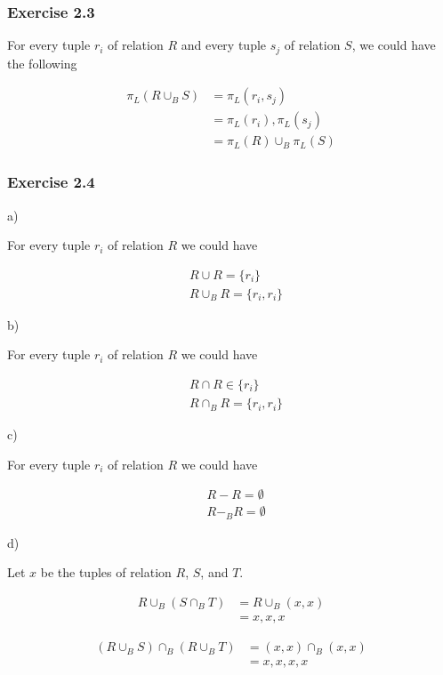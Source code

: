 \documentclass[../../main.tex]{subfiles}
\begin{document}
\subsubsection*{Exercise 2.3}

For every tuple $r_{i}$ of relation $R$ and every tuple $s_{j}$ of
relation $S$, we could have the following

\begin{align*}
  \pi_{L}(R \cup_{B} S) &= \pi_{L}(r_{i}, s_{j}) \\
                        &= \pi_{L}(r_{i}), \pi_{L}(s_{j}) \\
                        &= \pi_{L}(R) \cup_{B} \pi_{L}(S)
\end{align*}

\subsubsection*{Exercise 2.4}

a)

For every tuple $r_{i}$ of relation $R$ we could have

\begin{align*}
  & R \cup R = \{r_{i} \} \\
  & R \cup_{B} R = \{r_{i}, r_{i}\}
\end{align*}

b)

For every tuple $r_{i}$ of relation $R$ we could have

\begin{align*}
  & R \cap R \in \{r_{i}\} \\
  & R \cap_{B} R = \{r_{i}, r_{i}\}
\end{align*}

c)

For every tuple $r_{i}$ of relation $R$ we could have

\begin{align*}
  & R - R = \emptyset \\
  & R -_{B} R = \emptyset
\end{align*}

d)

Let $x$ be the tuples of relation $R$, $S$, and $T$.

\begin{align*}
  R \cup_{B} (S \cap_{B} T) &= R \cup_{B} (x, x) \\
                              &= x,x,x
\end{align*}

\begin{align*}
  (R \cup_{B} S) \cap_{B} (R \cup_{B} T) &= (x, x) \cap_{B} (x, x) \\
                                         &= x,x,x,x
\end{align*}
\end{document}
